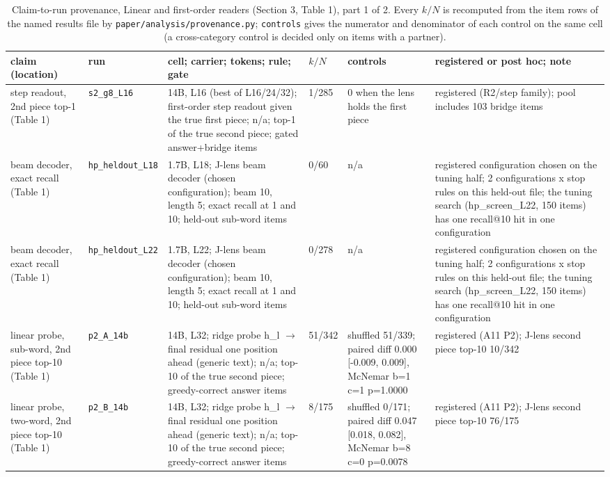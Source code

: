 \begin{table}[t]
\centering
\small
\setlength{\tabcolsep}{1mm}
\begin{tabular}{@{}p{2.5cm}p{2.3cm}p{4.5cm}p{1.3cm}p{3.0cm}p{2.9cm}@{}}
\toprule
claim (location) & run & cell; carrier; tokens; rule; gate & $k/N$ & controls & registered or post hoc; note \\
\midrule
step readout, 2nd piece top-1 (Table 1) & \texttt{s2\_\allowbreak{{}}g8\_\allowbreak{{}}L16} & 14B, L16 (best of L16/24/32); first-order step readout given the true first piece; n/a; top-1 of the true second piece; gated answer+bridge items & 1/285 & 0 when the lens holds the first piece & registered (R2/step family); pool includes 103 bridge items \\
beam decoder, exact recall (Table 1) & \texttt{hp\_\allowbreak{{}}heldout\_\allowbreak{{}}L18} & 1.7B, L18; J-lens beam decoder (chosen configuration); beam 10, length 5; exact recall at 1 and 10; held-out sub-word items & 0/60 & n/a & registered configuration chosen on the tuning half; 2 configurations x stop rules on this held-out file; the tuning search (hp\_screen\_L22, 150 items) has one recall@10 hit in one configuration \\
beam decoder, exact recall (Table 1) & \texttt{hp\_\allowbreak{{}}heldout\_\allowbreak{{}}L22} & 1.7B, L22; J-lens beam decoder (chosen configuration); beam 10, length 5; exact recall at 1 and 10; held-out sub-word items & 0/278 & n/a & registered configuration chosen on the tuning half; 2 configurations x stop rules on this held-out file; the tuning search (hp\_screen\_L22, 150 items) has one recall@10 hit in one configuration \\
linear probe, sub-word, 2nd piece top-10 (Table 1) & \texttt{p2\_\allowbreak{{}}A\_\allowbreak{{}}14b} & 14B, L32; ridge probe h\_l $\to$ final residual one position ahead (generic text); n/a; top-10 of the true second piece; greedy-correct answer items & 51/342 & shuffled 51/339; paired diff 0.000 [-0.009, 0.009], McNemar b=1 c=1 p=1.0000 & registered (A11 P2); J-lens second piece top-10 10/342 \\
linear probe, two-word, 2nd piece top-10 (Table 1) & \texttt{p2\_\allowbreak{{}}B\_\allowbreak{{}}14b} & 14B, L32; ridge probe h\_l $\to$ final residual one position ahead (generic text); n/a; top-10 of the true second piece; greedy-correct answer items & 8/175 & shuffled 0/171; paired diff 0.047 [0.018, 0.082], McNemar b=8 c=0 p=0.0078 & registered (A11 P2); J-lens second piece top-10 76/175 \\
\bottomrule
\end{tabular}
\caption{Claim-to-run provenance, Linear and first-order readers (Section 3, Table 1), part 1 of 2. Every $k/N$ is recomputed from the item rows of the named results file by \texttt{paper/analysis/provenance.py}; \texttt{controls} gives the numerator and denominator of each control on the same cell (a cross-category control is decided only on items with a partner).}
\end{table}

